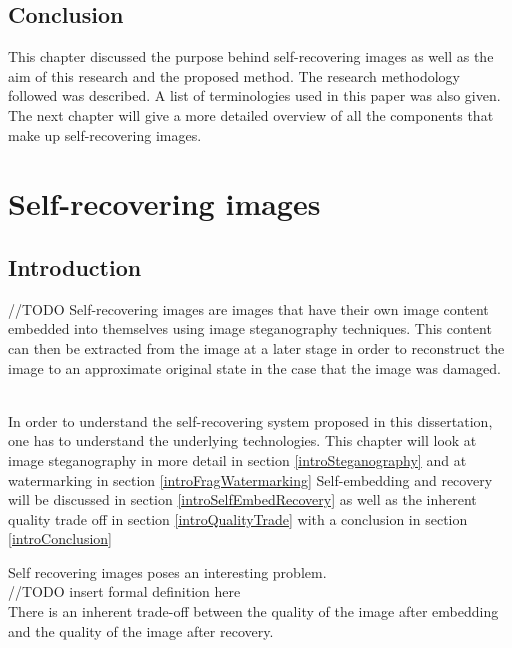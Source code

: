 \documentclass[12pt]{article}
\begin{document}
\subsection{Conclusion}
This chapter discussed the purpose behind self-recovering images as well as the aim of this research and the proposed method. 
The research methodology followed was described. A list of terminologies used in this paper was also given.
The next chapter will give a more detailed overview of all the components that make up self-recovering images. 

\section{Self-recovering images}

\subsection{Introduction}
//TODO
Self-recovering images are images that have their own image content embedded into themselves using image steganography techniques. 
This content can then be extracted from the image at a later stage in order to reconstruct the image to an approximate original state in the case that the image was damaged.

\hspace{0pt} \\
In order to understand the self-recovering system proposed in this dissertation, one has to understand the underlying technologies.  This chapter will look at image steganography in more detail in section \ref{introSteganography} and at watermarking in section \ref{introFragWatermarking}  Self-embedding and recovery will be discussed in section \ref{introSelfEmbedRecovery} as well as the inherent quality trade off in section \ref{introQualityTrade} with a conclusion in section \ref{introConclusion}

Self recovering images poses an interesting problem.
\hspace{0pt} \\
//TODO insert formal definition here
\hspace{0pt} \\
There is an inherent trade-off between the quality of the image after embedding and the quality of the image after recovery.

\end{document}
